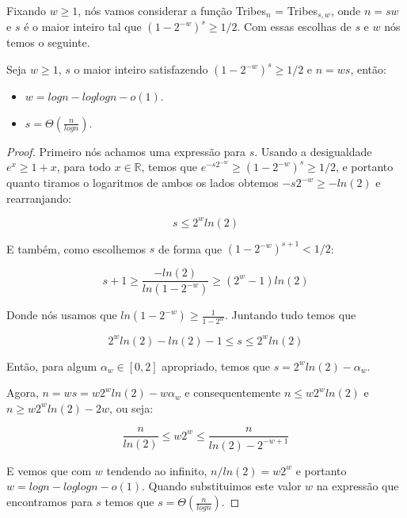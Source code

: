 Fixando $w \geq 1$, nós vamos considerar a função Tribes$_{n}$ = Tribes$_{s, w}$, onde $n = sw$ e $s$ é o maior inteiro tal que $(1 - 2^{-w})^{s} \geq 1/2$. Com essas escolhas de $s$ e $w$ nós temos o seguinte.

\begin{prop} \label{prop: tribes_n}

    Seja $w \geq 1$, $s$ o maior inteiro satisfazendo $(1 - 2^{-w})^{s} \geq 1/2$ e $n = ws$, então: 

    \begin{itemize}

        \item $w = logn - loglogn - o(1)$.

        \item $s = \Theta(\frac{n}{logn})$.

    \end{itemize}

\end{prop}

\begin{proof}

    Primeiro nós achamos uma expressão para $s$. Usando a desigualdade $e^{x} \geq 1 + x$, para todo $x \in \mathbb{R}$, temos que $e^{-s2^{-w}} \geq (1 - 2^{-w})^{s} \geq 1/2$, e portanto quanto tiramos o logaritmos de ambos os lados obtemos $-s2^{-w} \geq -ln(2)$ e rearranjando:

    \begin{equation*}
        s \leq 2^{w}ln(2)
    \end{equation*}

    E também, como escolhemos $s$ de forma que $(1 - 2^{-w})^{s + 1} < 1/2$:

    \begin{equation*}
        s + 1 \geq \frac{-ln(2)}{ln(1 - 2^{-w})} \geq (2^{w} - 1)ln(2)
    \end{equation*}

    Donde nós usamos que $ln(1 - 2^{-w}) \geq \frac{1}{1 - 2^{w}}$. Juntando tudo temos que 

    \begin{equation*}
       2^{w}ln(2) - ln(2) - 1 \leq s \leq 2^{w}ln(2)
    \end{equation*} 

    Então, para algum $\alpha_{w} \in [0, 2]$ apropriado, temos que $s = 2^{w}ln(2) - \alpha_{w}$. 

    Agora, $n = ws = w2^{w}ln(2) - w\alpha_{w}$ e consequentemente $n \leq w2^{w}ln(2)$ e $n \geq w2^{w}ln(2) - 2w$, ou seja:

    \begin{equation*}
        \frac{n}{ln(2)} \leq w2^{w} \leq \frac{n}{ln(2) - 2^{-w + 1}}
    \end{equation*}

    E vemos que com $w$ tendendo ao infinito, $n/ln(2) = w2^{w}$ e portanto $w = logn - loglogn - o(1)$. Quando substituimos este valor $w$ na expressão que encontramos para $s$ temos que $s = \Theta(\frac{n}{logn})$.

\end{proof}

